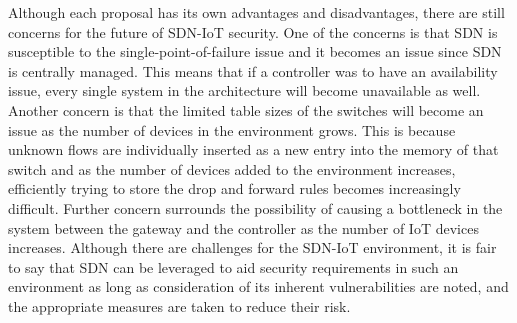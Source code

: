 Although each proposal has its own advantages and disadvantages, there are still concerns for the future of SDN-IoT security. One of the concerns is that SDN is susceptible to the single-point-of-failure issue and it becomes an issue since SDN is centrally managed. This means that if a controller was to have an availability issue, every single system in the architecture will become unavailable as well. Another concern is that the limited table sizes of the switches will become an issue as the number of devices in the environment grows. This is because unknown flows are individually inserted as a new entry into the memory of that switch and as the number of devices added to the environment increases, efficiently trying to store the drop and forward rules becomes increasingly difficult. Further concern surrounds the possibility of causing a bottleneck in the system between the gateway and the controller as the number of IoT devices increases. Although there are challenges for the SDN-IoT environment, it is fair to say that SDN can be leveraged to aid security requirements in such an environment as long as consideration of its inherent vulnerabilities are noted, and the appropriate measures are taken to reduce their risk.
